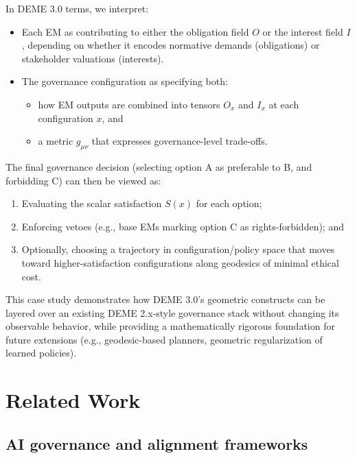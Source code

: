 \documentclass[12pt]{article}
\theoremstyle{remark}
\begin{document}
In DEME 3.0 terms, we interpret:

\begin{itemize}
    \item Each EM as contributing to either the obligation field $O$ or the interest field $I$, depending on whether it encodes normative demands (obligations) or stakeholder valuations (interests).

    \item The governance configuration as specifying both:
    \begin{itemize}
        \item how EM outputs are combined into tensors $O_x$ and $I_x$ at each configuration $x$, and
        \item a metric $g_{\mu\nu}$ that expresses governance-level trade-offs.
    \end{itemize}
\end{itemize}

The final governance decision (selecting option A as preferable to B, and forbidding C) can then be viewed as:

\begin{enumerate}
    \item Evaluating the scalar satisfaction $S(x)$ for each option;
    \item Enforcing vetoes (e.g., base EMs marking option C as rights-forbidden); and
    \item Optionally, choosing a trajectory in configuration/policy space that moves toward higher-satisfaction configurations along geodesics of minimal ethical cost.
\end{enumerate}

This case study demonstrates how DEME 3.0's geometric constructs can be layered over an existing DEME 2.x-style governance stack without changing its observable behavior, while providing a mathematically rigorous foundation for future extensions (e.g., geodesic-based planners, geometric regularization of learned policies).

\section{Related Work}

\subsection{AI governance and alignment frameworks}
\end{document}
